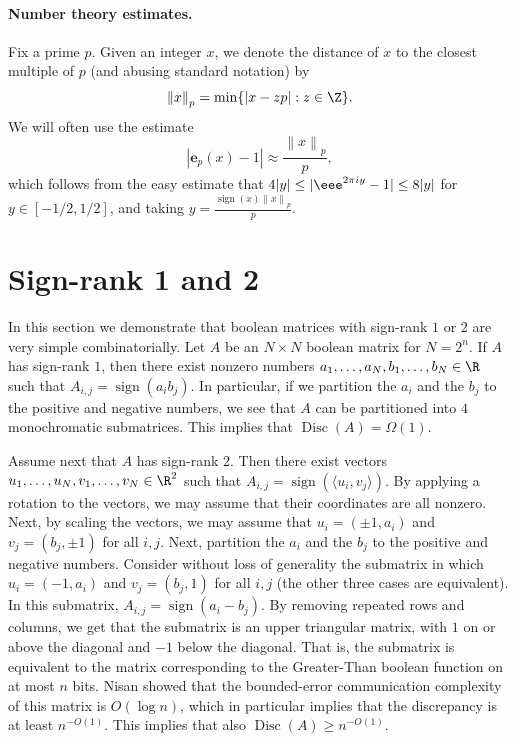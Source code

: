 \documentclass{toc}
\DeclareMathOperator{\Disc}{Disc}
\DeclareMathOperator{\sign}{sign}
\newcommand{\e}{\mathbf{e}}
\newcommand{\ip}[1]{\langle #1 \rangle}
\newcommand{\norm}[1]{\left\| #1 \right\|_p}
\begin{document}
\paragraph{Number theory estimates.} Fix a prime $p$.
Given an integer $x$, we denote the distance of $x$ to the closest multiple of $p$ (and abusing standard notation) by
$$\norm{x} = \min\{| x - zp |: z\in \Z\}.$$
We will often use the estimate
$$   |\e_p(x)-1|  \approx   \frac{\norm{x}}{p}, $$
which follows from the easy estimate that $4 |y| \le |\eee^{2 \pi i y} - 1| \le 8|y|$ for  $y \in [-1/2,1/2]$, and taking $y = \frac{\sign(x)\norm{x}}{p}$.


\section{ Sign-rank 1 and 2}\label{sec:signrank12}
In this section we demonstrate that boolean matrices with sign-rank $1$ or $2$ are very simple combinatorially. Let $A$ be an $N \times N$ boolean matrix
for $N=2^n$.
If $A$ has sign-rank $1$, then there exist nonzero numbers $a_1,\ldots,a_N, b_1,\ldots,b_N \in \R$ such that $A_{i,j} = \sign(a_i b_j)$. In particular,
if we partition the $a_i$ and the $b_j$ to the positive and negative numbers, we see that $A$ can be partitioned into $4$ monochromatic submatrices. This implies that $\Disc(A) = \Omega(1)$.

Assume next that $A$ has sign-rank $2$. Then there exist vectors $u_1,\ldots,u_N, v_1,\ldots,v_N  \in \R^2$ such that $A_{i,j} = \sign(\ip{u_i,v_j})$.
By applying a rotation to the vectors, we may assume that their coordinates are all nonzero. Next, by scaling the vectors, we may assume that $u_i=(\pm 1,a_i)$ and $v_j = (b_j, \pm 1)$ for all $i,j$.
Next, partition the $a_i$ and the $b_j$ to the positive and negative numbers. Consider without loss of generality the submatrix in which $u_i=(-1,a_i)$ and $v_j = (b_j, 1)$ for all $i,j$ (the other three cases are equivalent). In this submatrix, $A_{i,j} = \sign(a_i - b_j)$. By removing repeated rows and columns, we get that the submatrix is an upper triangular matrix, with $1$ on or above the diagonal and $-1$ below the diagonal. That is, the submatrix is equivalent to the matrix corresponding to the Greater-Than boolean function on at most $n$ bits.
Nisan \cite{nisan1993communication} showed that the bounded-error communication complexity of this matrix is $O(\log n)$, which in particular implies that the discrepancy is at least $n^{-O(1)}$. This implies that also $\Disc(A) \ge n^{-O(1)}$.
\end{document}
